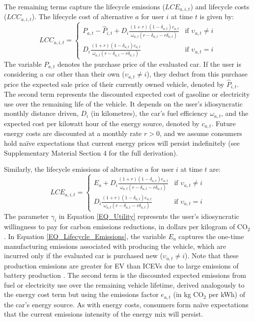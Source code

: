 \documentclass[12pt]{article}
\begin{document}
The remaining terms capture the lifecycle emissions ($LCE_{a,i,t}$) and lifecycle costs ($LCC_{a,i,t}$). The lifecycle cost of alternative $a$ for user $i$ at time $t$ is given by:
\begin{equation}
    LCC_{a,i,t} = 
    \begin{cases}
        P_{a,t} - \hat{P}_{i,t} + D_i\frac{(1+r)(1-\delta_{a,t})c_{a,t}}{\omega_{a,t}(r-\delta_{a,t}-r\delta_{a,t})} 
            & \text{if } \upsilon_{a,t} \neq i \\[12pt]
        D_i\frac{(1+r)(1-\delta_{a,t})c_{a,t}}{\omega_{a,t}(r-\delta_{a,t}-r\delta_{a,t})} 
            & \text{if } \upsilon_{a,t} = i
    \end{cases}
    \label{EQ_Lifecycle_Cost}
\end{equation}
The variable $P_{a,t}$ denotes the purchase price of the evaluated car. If the user is considering a car other than their own ($\upsilon_{a,t} \neq i$), they deduct from this purchase price the expected sale price of their currently owned vehicle, denoted by $\hat{P}_{i,t}$. The second term represents the discounted expected cost of gasoline or electricity use over the remaining life of the vehicle. It depends on the user's 
idiosyncratic monthly distance driven, $D_i$ (in kilometres), the car's fuel efficiency $\omega_{a,t}$, and the expected cost per kilowatt hour of the energy source, denoted by $c_{a,t}$. Future energy costs are discounted at a monthly rate $r>0$, and we assume consumers hold naïve expectations that current energy prices will persist indefinitely (see Supplementary Material Section 4 for the full derivation).

Similarly, the lifecycle emissions of alternative $a$ for user $i$ at time $t$ are:
\begin{equation}
    LCE_{a,i,t} = 
    \begin{cases}
        E_{a} + D_i\frac{(1+r)(1-\delta_{a,t})e_{a,t}}{\omega_{a,t}(r-\delta_{a,t}-r\delta_{a,t})} 
            & \text{if } \upsilon_{a,t} \neq i \\[12pt]
        D_i\frac{(1+r)(1-\delta_{a,t})e_{a,t}}{\omega_{a,t}(r-\delta_{a,t}-r\delta_{a,t})} 
            & \text{if } \upsilon_{a,t} = i
    \end{cases}
    \label{EQ_Lifecycle_Emissions}
\end{equation}
The parameter $\gamma_i$ in Equation \ref{EQ_Utility} represents the user's idiosyncratic willingness to pay for carbon emissions reductions, in dollars per kilogram of CO$_2$. In Equation \ref{EQ_Lifecycle_Emissions}, the variable $E_{a}$ captures the one-time manufacturing emissions associated with producing the vehicle, which are incurred only if the evaluated car is purchased new ($\upsilon_{a,t} \neq i$). Note that these production emissions are greater for EV than ICEVs due to large emissions of battery production \citep{konig2021overview}. The second term is the discounted expected emissions from fuel or electricity use over the remaining vehicle lifetime, derived analogously to the energy cost term but using the emissions factor $e_{a,t}$ (in kg CO$_2$ per kWh) of the car's energy source. As with energy costs, consumers form naïve expectations that the current emissions intensity of the energy mix will persist.
	
\end{document}
